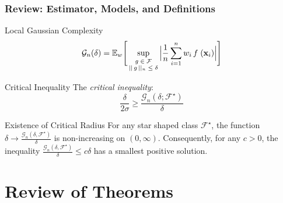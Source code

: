 \documentclass[11pt]{beamer}
\newcommand{\E}{\mathbb{E}}
\newcommand{\bx}{\mathbf{x}}
\newcommand{\cF}{\mathcal{F}}
\newcommand{\cG}{\mathcal{G}}
\begin{document}
	\begin{frame}
		\frametitle{Review: Estimator, Models, and Definitions}				
		\begin{block}{Local Gaussian Complexity}
			\begin{equation*}
			\cG_n(\delta) = \E_w\Bigg[\sup_{
				\begin{scriptsize}
				\begin{matrix}
				g\in \cF\\||\,g\,||_n \leq \delta
				\end{matrix}
				\end{scriptsize}}\Big|\frac{1}{n}\sum_{i = 1}^{n}w_i\, f\;(\bx_i)\Big|\Bigg] 
			\end{equation*}
		\end{block}
		
		\begin{block}{Critical Inequality}
			The \textit{critical inequality}:
			\begin{equation*}
			\frac{\delta}{2\sigma} \geq \frac{\cG_n(\delta; \cF^\star)}{\delta}
			\end{equation*}			
			\vspace{-0.3cm}
		\end{block}										
		\begin{block}{Existence of Critical Radius}
			For any star shaped class $\mathcal{F}^\star$, the function $\delta \rightarrow \frac{\cG_n(\delta, \cF^\star)}{\delta}$ is non-increasing on $(0, \infty)$. Consequently, for any $c>0$, the inequality $\frac{\cG_n(\delta, \cF^\star)}{\delta} \leq c\delta$
			has a smallest positive solution.
		\end{block}			
	\end{frame}
	
	\section{Review of Theorems}
	\frame{\sectionpage}
	
\end{document}
